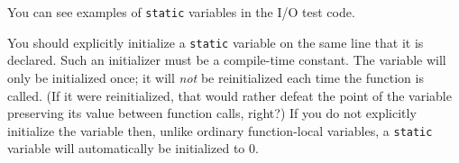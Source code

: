 You can see examples of \lstinline{static} variables in the I/O test code.

You should explicitly initialize a \lstinline{static} variable on the same line that it is declared.
Such an initializer must be a compile-time constant.
The variable will only be initialized once; it will \textit{not} be reinitialized each time the function is called.
(If it were reinitialized, that would rather defeat the point of the variable preserving its value between function calls, right?)
If you do not explicitly initialize the variable then, unlike ordinary function-local variables, a \lstinline{static} variable will automatically be initialized to 0.



